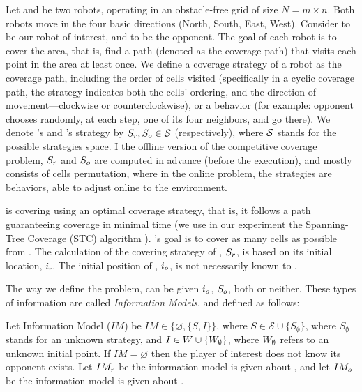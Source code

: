 Let \rob and \opp be two robots, operating in an obstacle-free grid \w of size $N=m \times n$. Both robots move in the four basic directions (North, South, East, West). Consider \rob to be our robot-of-interest, and \opp to be the opponent. 
The goal of each robot is to cover the area, that is, find a path (denoted as the coverage path) that visits  each point in the area at least once. We define a coverage strategy of a robot as the coverage path, including the order of cells visited (specifically in a cyclic coverage path, the strategy indicates both the cells' ordering, and the direction of movement---clockwise or counterclockwise), or a behavior (for example: opponent chooses randomly, at each step, one of its four neighbors, and go there). We denote \rob's and \opp's strategy by $S_r,S_o\in \mathcal{S}$ (respectively), where $\cal{S}$ stands for the possible strategies space. I the offline version of the competitive coverage problem, $S_r$ and $S_o$ are computed in advance (before the execution), and mostly consists of cells permutation, where in the online problem, the strategies are behaviors, able to adjust online to the environment.

\opp is covering \w using an optimal coverage strategy, that is, it follows a path guaranteeing coverage in minimal time (we use in our experiment the Spanning-Tree Coverage (STC) algorithm \cite{gabriely2001spanning}). \rob's goal is to cover as many cells as possible from . The calculation of the covering strategy of \rob, $S_r$, is based on its initial location, $i_r$. The initial position of \opp, $i_o$, is not necessarily known to \rob.

The way we define the problem, \rob can be given $i_o$, $S_o$, both or neither. These types of information are called {\em Information Models}, and defined as follows:
\begin{definition}
Let Information Model ($IM$) be $IM \in \lbrace \varnothing, \lbrace S,I\rbrace \rbrace$, where $S\in \mathcal{S} \cup \lbrace S_\emptyset \rbrace$, where $S_\emptyset$ stands for an unknown strategy, and $I \in W \cup \lbrace W_\emptyset \rbrace$, where $W_{\emptyset}$ refers to an unknown initial point. 
If $IM=\varnothing$ then the player of interest does not know its opponent exists.
Let $IM_r$ be the information model \rob is given about \opp, and let $IM_o$ be the information model \opp is given about \rob.
\end{definition}

